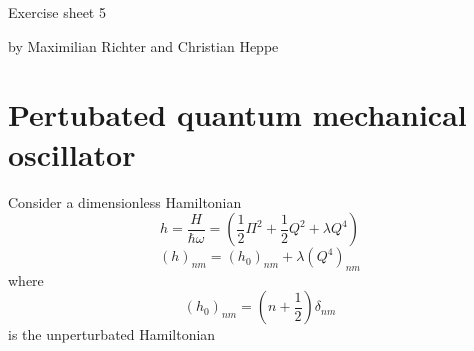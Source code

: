 \documentclass[12pt,a4paper]{article}
\begin{document}
\centerline{\large Exercise sheet 5}\vspace{0.5em}
\centerline{\large by Maximilian Richter and Christian Heppe}\vspace{1em}

\section*{Pertubated quantum mechanical oscillator}
Consider a dimensionless Hamiltonian 
\begin{equation}
h=\frac{H}{\hbar\omega}=\left(\frac{1}{2}\Pi^2+\frac{1}{2}Q^2+\lambda Q^4\right)
\end{equation}
\begin{equation}
(h)_{nm}=(h_0)_{nm}+\lambda(Q^4)_{nm}
\end{equation}
where 
\begin{equation}
(h_0)_{nm}=\left(n+\frac{1}{2}\right)\delta_{nm}
\end{equation}
is the unperturbated Hamiltonian
\end{document}
